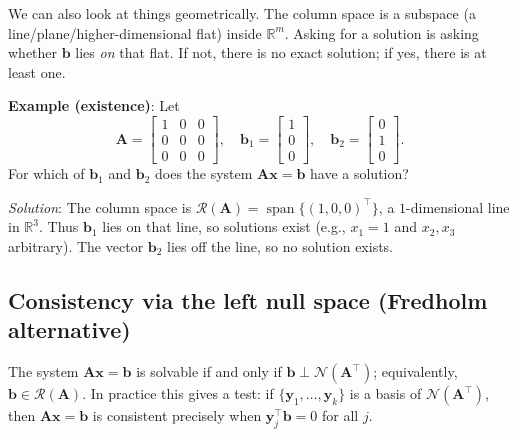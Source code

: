We can also look at things geometrically. The column space is a subspace (a line/plane/higher-dimensional flat) inside $\mathbb{R}^m$. Asking for a solution is asking whether $\mathbf{b}$ lies \emph{on} that flat. If not, there is no exact solution; if yes, there is at least one.

\begin{exampleBox}
\textbf{Example (existence)}: Let
\[
\mathbf{A}=\begin{bmatrix}1&0&0\\ 0&0&0\\ 0&0&0\end{bmatrix},\quad
\mathbf{b}_1=\begin{bmatrix}1\\0\\0\end{bmatrix},\quad
\mathbf{b}_2=\begin{bmatrix}0\\1\\0\end{bmatrix}.
\]
For which of $\mathbf{b}_1$ and $\mathbf{b}_2$ does the system $\mathbf{A}\mathbf{x} = \mathbf{b}$ have a solution?

\emph{Solution}: The column space is $\mathcal{R}(\mathbf{A})=\operatorname{span}\{(1,0,0)^{\top}\}$, a $1$-dimensional line in $\mathbb{R}^3$. Thus $\mathbf{b}_1$ lies on that line, so solutions exist (e.g., $x_1=1$ and $x_2,x_3$ arbitrary). The vector $\mathbf{b}_2$ lies off the line, so no solution exists.
\end{exampleBox}

\subsection{Consistency via the left null space (Fredholm alternative)}
The system $\mathbf{A}\mathbf{x}=\mathbf{b}$ is solvable if and only if $\mathbf{b}\perp \mathcal{N}(\mathbf{A}^{\top})$; equivalently, $\mathbf{b}\in\mathcal{R}(\mathbf{A})$. In practice this gives a test: if $\{\mathbf{y}_1,\dots,\mathbf{y}_k\}$ is a basis of $\mathcal{N}(\mathbf{A}^{\top})$, then $\mathbf{A}\mathbf{x}=\mathbf{b}$ is consistent precisely when $\mathbf{y}_j^{\top}\mathbf{b}=0$ for all $j$.

